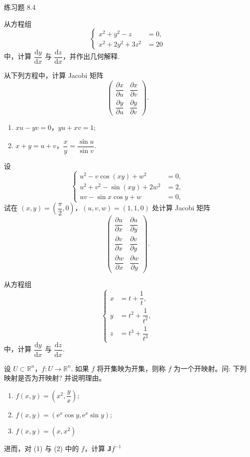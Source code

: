 \begin{exblock}{练习题 8.4}
\item 从方程组
\[
  \left\{\begin{aligned}
    x^{2} + y^{2} - z &= 0, \\
    x^{2} + 2y^{2} + 3z^{2} &= 20
  \end{aligned}\right.
\]
中，计算 $\dfrac{\mathrm{d}y}{\mathrm{d}x}$ 与 $\dfrac{\mathrm{d}z}{\mathrm{d}x}$，并作出几何解释.

\item 从下列方程中，计算 Jacobi 矩阵
\[
  \begin{pmatrix} \dfrac{\partial x}{\partial u} & \dfrac{\partial x}{\partial v} \\[6pt] \dfrac{\partial y}{\partial u} & \dfrac{\partial y}{\partial v} \end{pmatrix}.
\]
\begin{enumerate}
  \item[(1)] $xu - yv = 0$，$yu + xv = 1$;
  \item[(2)] $x + y = u + v$，$\dfrac{x}{y} = \dfrac{\sin u}{\sin v}$.
\end{enumerate}

\item 设
\[
  \left\{\begin{aligned}
    u^{2} - v\cos(xy) + w^{2} &= 0, \\
    u^{2} + v^{2} - \sin(xy) + 2w^{2} &= 2, \\
    uv - \sin x \cos y + w &= 0,
  \end{aligned}\right.
\]
试在 $(x,y) = \left(\dfrac{\pi}{2},0\right)$，$(u,v,w) = (1,1,0)$ 处计算 Jacobi 矩阵
\[
  \begin{pmatrix} \dfrac{\partial u}{\partial x} & \dfrac{\partial u}{\partial y} \\[6pt] \dfrac{\partial v}{\partial x} & \dfrac{\partial v}{\partial y} \\[6pt] \dfrac{\partial w}{\partial x} & \dfrac{\partial w}{\partial y} \end{pmatrix}.
\]

\item 从方程组
\[
  \left\{\begin{aligned}
    x &= t + \dfrac{1}{t}, \\
    y &= t^{2} + \dfrac{1}{t^{2}}, \\
    z &= t^{3} + \dfrac{1}{t^{3}}
  \end{aligned}\right.
\]
中，计算 $\dfrac{\mathrm{d}y}{\mathrm{d}x}$ 与 $\dfrac{\mathrm{d}z}{\mathrm{d}x}$.

\item 设 $U \subset \mathbb{R}^{n}$，$f: U \to \mathbb{R}^{n}$. 如果 $f$ 将开集映为开集，则称 $f$ 为一个开映射。问: 下列映射是否为开映射? 并说明理由。
\begin{enumerate}
  \item[(1)] $f(x,y) = \left(x^{2},\dfrac{y}{x}\right)$;
  \item[(2)] $f(x,y) = \left(\mathrm{e}^{x}\cos y,\mathrm{e}^{x}\sin y\right)$;
  \item[(3)] $f(x,y) = (x,x^{2})$
\end{enumerate}
进而，对 (1) 与 (2) 中的 $f$，计算 $\boldsymbol{J}f^{-1}$


\end{exblock}
